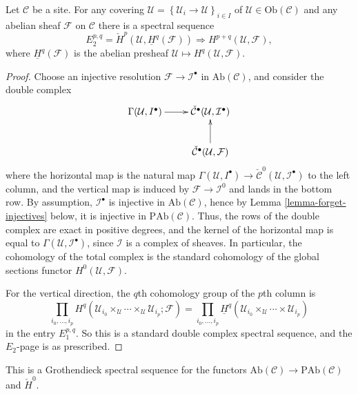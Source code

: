 \begin{theorem}
\label{theorem-cech-ss}
Let $\mathcal{C}$ be a site. For any covering $\mathcal{U}=
\left\{\mathcal{U}_i\to \mathcal{U}\right\}_{i\in I}$ of $\mathcal{U}\in
\text{Ob}(\mathcal{C})$ and any abelian sheaf $\mathcal{F}$ on $\mathcal{C}$
there is a spectral sequence
$$
E_2^{p, q}
=
\check H^p(\mathcal{U},\underline{H}^q(\mathcal{F}))
\Rightarrow
H^{p+q}(\mathcal{U}, \mathcal{F}),
$$
where $\underline{H}^q(\mathcal{F})$ is the abelian presheaf
$\mathcal{U}\mapsto H^q(\mathcal{U}, \mathcal{F})$.
\end{theorem}

\begin{proof}
Choose an injective resolution $\mathcal{F}\to \mathcal{I}^\bullet$ in
$\text{Ab}(\mathcal{C})$, and consider the double complex
$$
\xymatrix{
{\Gamma(\mathcal{U}, I^\bullet)} \ar[r] &
{\check{\mathcal{C}}^\bullet(\mathcal{U}, \mathcal{I}^\bullet)} \\
& {\check{\mathcal{C}}^\bullet(\mathcal{U}, \mathcal{F})} \ar[u]
}
$$
where the horizontal map is the natural map $\Gamma(\mathcal{U}, I^\bullet)
\to \check{\mathcal{C}}^0(\mathcal{U}, \mathcal{I}^\bullet)$ to the left
column, and the vertical map is induced by $\mathcal{F}\to \mathcal{I}^0$ and
lands in the bottom row. By assumption, $\mathcal{I}^\bullet$ is injective in
$\text{Ab}(\mathcal{C})$, hence by
Lemma \ref{lemma-forget-injectives}
below, it is injective in
$\text{PAb}(\mathcal{C})$. Thus, the rows of the double complex are exact in
positive degrees, and the kernel of the horizontal map is equal to
$\Gamma(\mathcal{U}, \mathcal{I}^\bullet)$, since $\mathcal{I}$ is a complex of
sheaves. In particular, the cohomology of the total complex is the standard
cohomology of the global sections functor $H^0(\mathcal{U}, \mathcal{F})$.

\medskip\noindent
For the vertical direction, the $q$th cohomology group of the $p$th column is
$$
\prod_{i_0,\ldots, i_p} H^q(\mathcal{U}_{i_0}\times_\mathcal{U} \cdots
\times_\mathcal{U} \mathcal{U}_{i_p} ; \mathcal{F}) =\prod_{i_0, \dots,
i_p}\underline{H}^q(\mathcal{U}_{i_0}\times_\mathcal{U} \cdots \times
\mathcal{U}_{i_p})
$$
in the entry $E_1^{p,q}$. So this is a standard double complex spectral
sequence, and the $E_2$-page is as prescribed.
\end{proof}

\begin{remark}
\label{remark-grothendieck-ss}
This is a Grothendieck spectral sequence for the functors
$\text{Ab}(\mathcal{C}) \to \text{PAb}(\mathcal{C})$ and $\check H^0$.
\end{remark}






